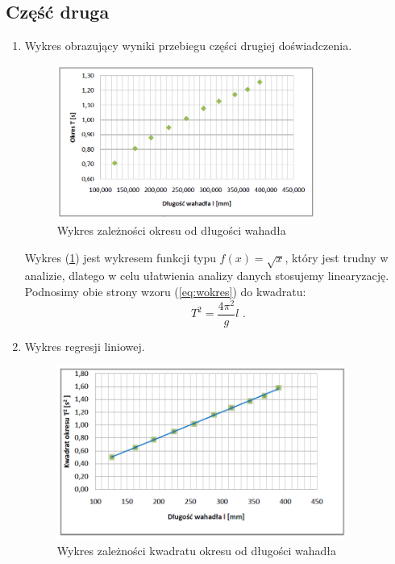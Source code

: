 \documentclass [a4paper,11pt]{article}
\begin{document}
		\subsection{Część druga}
	\begin{enumerate}[label=\alph*)]
		\item Wykres obrazujący wyniki przebiegu części drugiej doświadczenia.
		\renewcommand*{\figurename}{Wykres} 
		\setcounter{figure}{0}
		\begin{figure}[!h]
			\centering
			\includegraphics[width=0.8\textwidth]{wyk1}
			\caption{Wykres zależności okresu od długości wahadła}
			\label{fig:w1}
		\end{figure}
	
		Wykres (\ref{fig:w1}) jest wykresem funkcji typu $f(x)=\sqrt{x}$, który jest trudny w analizie, dlatego w celu ułatwienia analizy danych stosujemy linearyzację.
		Podnosimy obie strony wzoru (\ref{eq:wokres}) do kwadratu: 
		\begin{equation}
		\label{eq:kokres} 
		T^2= \frac{4 \pi^2}{g}l \text{ .}
		\end{equation}
		\item Wykres regresji liniowej.
		\begin{figure}[!h]
			\centering
			\includegraphics[width=0.9\textwidth]{wykr1}
			\caption{Wykres zależności kwadratu okresu od długości wahadła}
			\label{fig:wykr1}
		\end{figure}
		

\end{enumerate}
\end{document}
